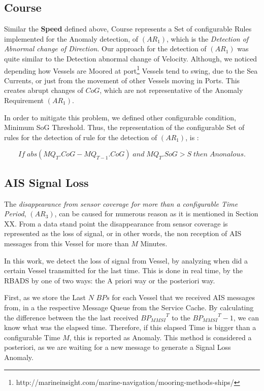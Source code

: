 \subsection{Course}
Similar the \textbf{Speed} defined above, Course represents a Set of configurable Rules implemented for the Anomaly detection, of $(AR_1)$, which is the \textit{Detection of Abnormal change of Direction}. 
Our approach for the detection of $(AR_1)$ was quite similar to the {Detection abnormal change of Velocity}. 
Although, we noticed depending how Vessels are Moored at port\footnote{http://marineinsight.com/marine-navigation/mooring-methods-ships/}  Vessels tend to swing, due to the Sea Currents, or just from the movement of other Vessels moving in Ports. This creates abrupt changes of $CoG$, which are not representative of the Anomaly Requirement $(AR_1)$.

In order to mitigate this problem, we defined other configurable condition, Minimum SoG Threshold. Thus, the representation of the configurable Set of rules for the detection of rule for the detection of $(AR_1)$, is :

\[ If\; abs(MQ_{T}.CoG - MQ_{T-1}.CoG)\;and\; MQ_T.SoG > S\; then\; Anonalous.\]

\subsection{AIS Signal Loss}
The \textit{disappearance from sensor coverage for more than a configurable Time Period}, $(AR_3)$, can be caused for numerous reason as it is mentioned in Section XX. From a data stand point the disappearance from sensor coverage is represented as the loss of signal, or in other words, the non reception of AIS messages from this Vessel for more than $M$ Minutes.

In this work, we detect the loss of signal from Vessel, by analyzing when did a certain Vessel transmitted for the last time. This is done in real time, by the RBADS by one of two ways: the A priori way or the posteriori way.

First, as we store the Last $N$ $BPs$ for each Vessel that we received AIS messages from, in a the respective Message Queue from the Service Cache. By calculating the difference between the the last received ${BP_{MMSI}}^T$ to the ${BP_{MMSI}}^T-1$, we can know what was the elapsed time. Therefore, if this elapsed Time is bigger than a configurable Time $M$, this is reported as Anomaly. This method is considered a posteriori, as we are waiting for a new message to generate a Signal Loss Anomaly.

